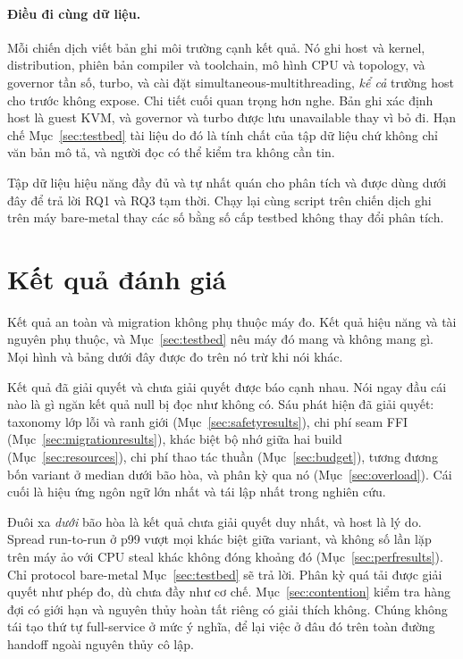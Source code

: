 \paragraph{Điều đi cùng dữ liệu.}
Mỗi chiến dịch viết bản ghi môi trường cạnh kết quả. Nó ghi host và kernel,
distribution, phiên bản compiler và toolchain, mô hình CPU và topology, và governor tần số,
turbo, và cài đặt simultaneous-multithreading, \emph{kể cả} trường host cho trước
không expose. Chi tiết cuối quan trọng hơn nghe. Bản ghi xác định host
là guest KVM, và governor và turbo được lưu unavailable thay vì bỏ
đi. Hạn chế Mục~\ref{sec:testbed} tài liệu do đó là tính chất của tập dữ liệu
chứ không chỉ văn bản mô tả, và người đọc có thể kiểm tra không cần tin.

Tập dữ liệu hiệu năng đầy đủ và tự nhất quán cho phân tích và được dùng dưới đây để
trả lời RQ1 và RQ3 tạm thời. Chạy lại cùng script trên chiến dịch ghi trên
máy bare-metal thay các số bằng số cấp testbed không thay đổi
phân tích.

\section{Kết quả đánh giá}
Kết quả an toàn và migration không phụ thuộc máy đo. Kết quả hiệu năng và
tài nguyên phụ thuộc, và Mục~\ref{sec:testbed} nêu máy đó mang và không mang gì.
Mọi hình và bảng dưới đây được đo trên nó trừ khi nói khác.

Kết quả đã giải quyết và chưa giải quyết được báo cạnh nhau. Nói ngay đầu cái nào là gì
ngăn kết quả null bị đọc như không có. Sáu phát hiện đã giải quyết: taxonomy
lớp lỗi và ranh giới (Mục~\ref{sec:safetyresults}), chi phí seam FFI
(Mục~\ref{sec:migrationresults}), khác biệt bộ nhớ giữa hai build
(Mục~\ref{sec:resources}), chi phí thao tác thuần (Mục~\ref{sec:budget}), tương đương bốn variant ở median dưới bão hòa, và phân kỳ qua nó
(Mục~\ref{sec:overload}). Cái cuối là hiệu ứng ngôn ngữ lớn nhất và tái lập nhất
trong nghiên cứu.

Đuôi xa \emph{dưới} bão hòa là kết quả chưa giải quyết duy nhất, và host là lý do.
Spread run-to-run ở p99 vượt mọi khác biệt giữa variant, và không số lần lặp
trên máy ảo với CPU steal khác không đóng khoảng đó
(Mục~\ref{sec:perfresults}). Chỉ protocol bare-metal Mục~\ref{sec:testbed} sẽ
trả lời. Phân kỳ quá tải được giải quyết như phép đo, dù chưa đầy như cơ chế.
Mục~\ref{sec:contention} kiểm tra hàng đợi có giới hạn và nguyên thủy hoàn tất riêng
có giải thích không. Chúng không tái tạo thứ tự full-service ở mức ý nghĩa, để lại
việc ở đâu đó trên toàn đường handoff ngoài nguyên thủy cô lập.

